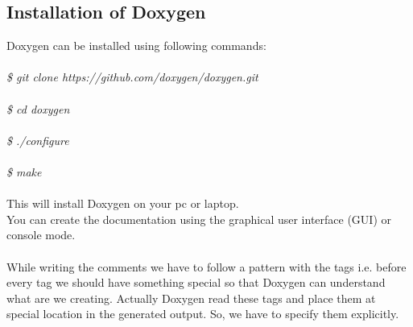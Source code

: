 \subsection{Installation of Doxygen}
Doxygen can be installed using following commands:\\\\
\emph{
\$ git clone https://github.com/doxygen/doxygen.git\\\\
\$ cd doxygen\\\\
\$ ./configure\\\\
\$ make \\\\}
This will install Doxygen on your pc or laptop.\\
You can create the documentation using the graphical user interface (GUI) or console mode.\\\\
While writing the comments we have to follow a pattern with the tags i.e. before every tag we should have something special so that Doxygen can understand what are we creating. Actually Doxygen read these tags and place them at special location in the generated output. So, we have to specify them explicitly. 



